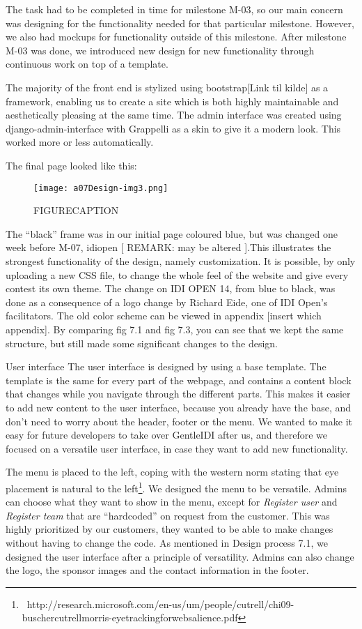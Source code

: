 The task had to be completed in time for milestone M-03, so our main
concern was designing for the functionality needed for that particular
milestone. However, we also had mockups for functionality outside of
this milestone. After milestone M-03 was done, we introduced new design
for new functionality through continuous work on top of a template.

The majority of the front end is stylized using bootstrap[Link til
kilde] as a framework, enabling us to create a site which is both
highly maintainable and aesthetically pleasing at the same time. The
admin interface was created using django-admin-interface with Grappelli
as a skin to give it a modern look. This worked more or less
automatically.


The final page looked like this:
 \begin{figure}[h!]
	\texttt{[image: a07Design-img3.png]} 
	\caption{FIGURECAPTION}
\end{figure}

The ``black'' frame was in our
initial page coloured blue, but was changed one week before M-07,
idiopen [ REMARK: may be altered ].This illustrates the strongest
functionality of the design, namely customization. It is possible, by
only uploading a new CSS file, to change the whole feel of the website
and give every contest its own theme. The change on IDI OPEN 14, from
blue to black, was done as a consequence of a logo change by Richard
Eide, one of IDI Open's facilitators. The old color
scheme can be viewed in appendix [insert which appendix]. By comparing
fig 7.1 and fig 7.3, you can see that we kept the same structure, but
still made some significant changes to the design.


User interface
The user interface is designed by using a base template. The template is
the same for every part of the webpage, and contains a content block
that changes while you navigate through the different parts. This makes
it easier to add new content to the user interface, because you already
have the base, and don't need to worry about the
header, footer or the menu. We wanted to make it easy for future
developers to take over GentleIDI after us, and therefore we focused on
a versatile user interface, in case they want to add new functionality.

The menu is placed to the left, coping with the western norm stating
that eye placement is natural to the
left\footnote{\ http://research.microsoft.com/en-us/um/people/cutrell/chi09-buschercutrellmorris-eyetrackingforwebsalience.pdf}.
We designed the menu to be versatile. Admins can choose what they want
to show in the menu, except for \textit{Register user} and
\textit{Register team }that are
``hardcoded'' on request from the
customer. This was highly prioritized by our customers, they wanted to
be able to make changes without having to change the code. As mentioned
in Design process 7.1, we designed the user interface after a principle
of versatility. Admins can also change the logo, the sponsor images and
the contact information in the footer.

